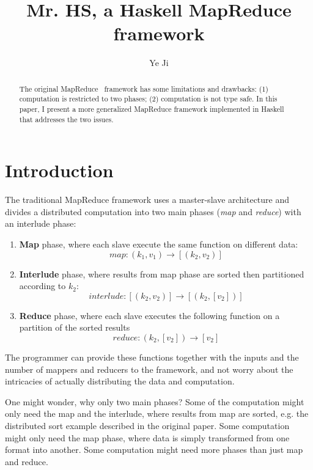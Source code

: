 \documentclass[a4paper]{article}
\begin{document}
\title{Mr. HS, a Haskell MapReduce framework}
\author{Ye Ji}
\maketitle

\begin{abstract}
  The original MapReduce~\cite{dean2008mapreduce} framework has some limitations and drawbacks:
  (1) computation is restricted to two phases;
  (2) computation is not type safe.
  In this paper, I present a more generalized MapReduce framework implemented
  in Haskell that addresses the two issues.
\end{abstract}

\section{Introduction}
The traditional MapReduce framework
uses a master-slave architecture and
divides a distributed computation into two main phases ({\it map} and {\it reduce}) with an interlude phase:
\begin{enumerate}
\item
  {\bf Map} phase, where each slave execute the same function on different data:
\begin{equation*}
map : (k_1,v_1) \rightarrow [(k_2,v_2)]
\end{equation*}
\item {\bf Interlude} phase, where results from map phase are sorted then partitioned
  according to $k_2$: 
  \begin{equation*}
    interlude : [(k_2, v_2)] \rightarrow [(k_2, [v_2])]
  \end{equation*}
\item
  {\bf Reduce} phase, where each slave executes the following function
  on a partition of the sorted results 
  \[
  reduce : (k_2, [v_2]) \rightarrow [v_2]
  \]
\end{enumerate}
The programmer can provide these functions together with the
inputs and the number of mappers and reducers to the framework, 
and not worry
about the intricacies of actually distributing the data and computation.

One might wonder, why only two main phases?
Some of the computation might only need the map and the interlude, where
results from map are sorted, e.g. the distributed sort example 
described in the original paper. Some computation might only need
the map phase, where data is simply transformed from one format 
into another.
Some computation might need more phases than just map and reduce.
\end{document}
